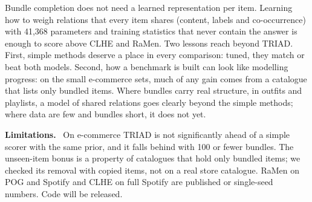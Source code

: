 \documentclass[runningheads]{llncs}
\renewcommand{\paragraph}[1]{\smallskip\noindent\textbf{#1}\ }
\begin{document}
Bundle completion does not need a learned representation per item. Learning how to weigh relations that every item
shares (content, labels and co-occurrence) with 41,368 parameters and training statistics that never contain the
answer is enough to score above CLHE and RaMen. Two lessons reach beyond TRIAD. First, simple methods deserve a place
in every comparison: tuned, they match or beat both models. Second, how a benchmark
is built can look like modelling progress: on the small e-commerce sets, much of any gain comes from a
catalogue that lists only bundled items. Where bundles carry real structure, in outfits and playlists, a model of shared
relations goes clearly beyond the simple methods; where data are few and bundles short, it does not yet.

\paragraph{Limitations.} On e-commerce TRIAD is not significantly ahead of a simple scorer with the same prior, and it
falls behind with 100 or fewer bundles. The unseen-item bonus is a property of catalogues that hold only bundled
items; we checked its removal with copied items, not on a real store catalogue. RaMen on POG and Spotify and CLHE on
full Spotify are published or single-seed numbers. Code will be released.
\end{document}
